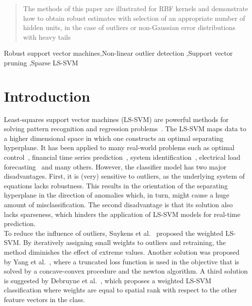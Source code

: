 \documentclass[preprint,12pt]{elsarticle}
\begin{document}
\begin{frontmatter}
\begin{abstract}
			The methods of this paper are illustrated for RBF kernels and demonstrate how to obtain
			robust estimates with selection of an appropriate number of hidden units, in the case of
			outliers or non-Gaussian error distributions with heavy tails
			
		\end{abstract}
		
		\begin{keyword}
			Robust support vector machines\sep Non-linear outlier detection \sep Support vector pruning \sep Sparse LS-SVM 
		\end{keyword}
	\end{frontmatter}
	
	
	\tableofcontents
	\newpage
	
	\section{Introduction}
	
	Least-squares support vector machines (LS-SVM) are powerful methods for solving pattern recognition and regression problems~\cite{suykens2002least}. The LS-SVM maps data to a higher dimensional space in which one constructs an optimal separating hyperplane. It has been applied to many real-world problems such as optimal control~\cite{suykens2001optimal}, financial time series prediction~\cite{van2001financial}, system identification~\cite{goethals2005identification}, electrical load forecasting~\cite{espinoza2006fixed} and many others. However, the classifier model has two major disadvantages. First, it is (very) sensitive to outliers, as the underlying system of equations lacks robustness. This results in the orientation of the separating hyperplane in the direction of anomalies which, in turn, might cause a huge amount of misclassification. The second disadvantage is that its solution also lacks sparseness, which hinders the application of LS-SVM models for  real-time prediction. \\
	
	To reduce the influence of outliers, Suykens et al.~\cite{suykens2002weighted} proposed the weighted LS-SVM. By iteratively assigning small weights to outliers and retraining, the method diminishes the effect of extreme values. Another solution was proposed by Yang et al.~\cite{yang2014robust}, where a truncated loss function is used in the objective that is solved by a concave-convex procedure and the newton algorithm. A third solution is suggested by Debruyne et al.~\cite{debruyne2009robustified}, which proposes a weighted LS-SVM classification where weights are equal to spatial rank with respect to the other feature vectors in the class.
	
\end{document}

